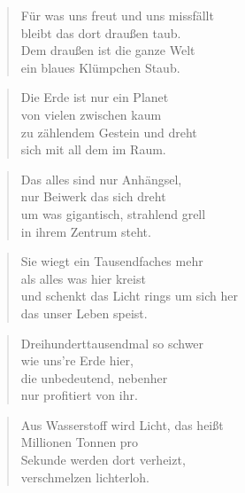\documentclass[10pt,a4paper]{article}
\begin{document}
\begin{paracol}{2}
\begin{verse}
Für was uns freut und uns missfällt \\
bleibt das dort draußen taub. \\
Dem draußen ist die ganze Welt \\
ein blaues Klümpchen Staub. \\
\end{verse}

\begin{verse}
Die Erde ist nur ein Planet \\
von vielen zwischen kaum \\
zu zählendem Gestein und dreht \\
sich mit all dem im Raum. \\
\end{verse}

\begin{verse}
Das alles sind nur Anhängsel, \\
nur Beiwerk das sich dreht \\
um was gigantisch, strahlend grell \\
in ihrem Zentrum steht. \\
\end{verse}

\begin{verse}
Sie wiegt ein Tausendfaches mehr \\
als alles was hier kreist \\
und schenkt das Licht rings um sich her \\
das unser Leben speist. \\
\end{verse}

\begin{verse}
Dreihunderttausendmal so schwer \\
wie uns’re Erde hier, \\
die unbedeutend, nebenher \\
nur profitiert von ihr. \\
\end{verse}

\begin{verse}
Aus Wasserstoff wird Licht, das heißt \\
Millionen Tonnen pro \\
Sekunde werden dort verheizt, \\
verschmelzen lichterloh. \\
\end{verse}


\end{paracol}
\end{document}
